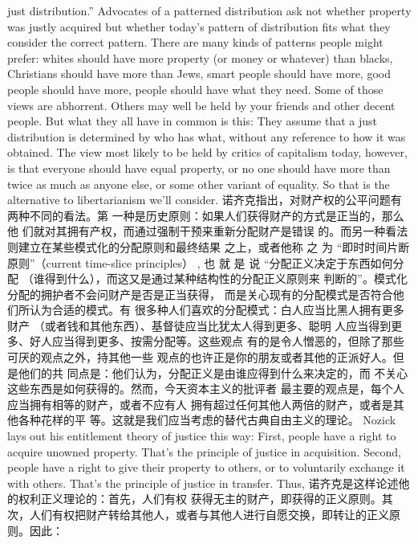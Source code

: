 \begin{paracol}{2}
just distribution.'' Advocates of a patterned distribution ask not
whether property was justly acquired but whether today's pattern of distribution fits what they consider the correct pattern.
There are many kinds of patterns people might prefer: whites
should have more property (or money or whatever) than blacks,
Christians should have more than Jews, smart people should
have more, good people should have more, people should have
what they need. Some of those views are abhorrent. Others may
well be held by your friends and other decent people. But what
they all have in common is this: They assume that a just distribution is determined by who has what, without any reference to
how it was obtained. The view most likely to be held by critics
of capitalism today, however, is that everyone should have equal
property, or no one should have more than twice as much as
anyone else, or some other variant of equality. So that is the alternative to libertarianism we'll consider.
\switchcolumn
诺齐克指出，对财产权的公平问题有两种不同的看法。第
一种是历史原则：如果人们获得财产的方式是正当的，那么他
们就对其拥有产权，而通过强制干预来重新分配财产是错误
的。而另一种看法则建立在某些模式化的分配原则和最终结果
之上，或者他称 之 为 “即时时间片断原则”（current time-slice principles） , 也 就 是 说 “分配正义决定于东西如何分配
（谁得到什么），而这又是通过某种结构性的分配正义原则来
判断的”。模式化分配的拥护者不会问财产是否是正当获得，
而是关心现有的分配模式是否符合他们所认为合适的模式。有
很多种人们喜欢的分配模式：白人应当比黑人拥有更多财产
（或者钱和其他东西）、基督徒应当比犹太人得到更多、聪明
人应当得到更多、好人应当得到更多、按需分配等。这些观点
有的是令人憎恶的，但除了那些可厌的观点之外，持其他一些
观点的也许正是你的朋友或者其他的正派好人。但是他们的共
同点是：他们认为，分配正义是由谁应得到什么来决定的，而
不关心这些东西是如何获得的。然而，今天资本主义的批评者
最主要的观点是，每个人应当拥有相等的财产，或者不应有人
拥有超过任何其他人两倍的财产，或者是其他各种花样的平
等。这就是我们应当考虑的替代古典自由主义的理论。
\switchcolumn*
Nozick lays out his entitlement theory of justice this way:
First, people have a right to acquire unowned property. That's
the principle of justice in acquisition. Second, people have a
right to give their property to others, or to voluntarily exchange
it with others. That's the principle of justice in transfer. Thus,
\switchcolumn
诺齐克是这样论述他的权利正义理论的：首先，人们有权
获得无主的财产，即获得的正义原则。其次，人们有权把财产转给其他人，或者与其他人进行自愿交换，即转让的正义原
则。因此：
\switchcolumn*
\begin{quotation}

\end{quotation}
\end{paracol}
